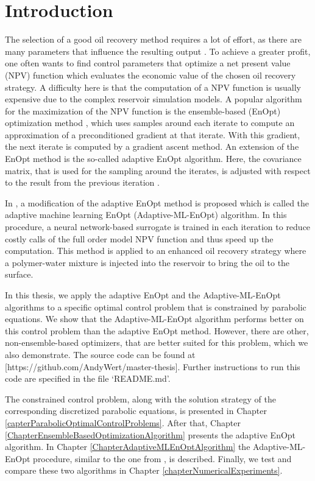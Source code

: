 \chapter{Introduction}

The selection of a good oil recovery method requires a lot of effort, as there are many parameters that influence the resulting output \cite{doi:10.1137/1.9780898717075}. To achieve a greater profit, one often wants to find control parameters that optimize a net present value (NPV) function which evaluates the economic value of the chosen oil recovery strategy. A difficulty here is that the computation of a NPV function is usually expensive due to the complex reservoir simulation models. A popular algorithm for the maximization of the NPV function is the ensemble-based (EnOpt) optimization method \cite{articleChen}, which uses samples around each iterate to compute an approximation of a preconditioned gradient at that iterate. With this gradient, the next iterate is computed by a gradient ascent method. An extension of the EnOpt method is the so-called adaptive EnOpt algorithm. Here, the covariance matrix, that is used for the sampling around the iterates, is adjusted with respect to the result from the previous iteration \cite{Stordal2016-cj}.

In \cite{Keil2022-dj}, a modification of the adaptive EnOpt method is proposed which is called the adaptive machine learning EnOpt (Adaptive-ML-EnOpt) algorithm. In this procedure, a neural network-based surrogate is trained in each iteration to reduce costly calls of the full order model NPV function and thus speed up the computation. This method is applied to an enhanced oil recovery strategy \cite{ABIDIN201211} where a polymer-water mixture is injected into the reservoir to bring the oil to the surface.

In this thesis, we apply the adaptive EnOpt and the Adaptive-ML-EnOpt algorithms to a specific optimal control problem that is constrained by parabolic equations. We show that the Adaptive-ML-EnOpt algorithm performs better on this control problem than the adaptive EnOpt method. However, there are other, non-ensemble-based optimizers, that are better suited for this problem, which we also demonstrate. The source code can be found at [https://github.com/AndyWert/master-thesis]. Further instructions to run this code are specified in the file `README.md'.

The constrained control problem, along with the solution strategy of the corresponding discretized parabolic equations, is presented in Chapter \ref{capterParabolicOptimalControlProblems}. After that, Chapter \ref{ChapterEnsembleBasedOptimizationAlgorithm} presents the adaptive EnOpt algorithm. In Chapter \ref{ChapterAdaptiveMLEnOptAlgorithm} the Adaptive-ML-EnOpt procedure, similar to the one from \cite{Keil2022-dj}, is described. Finally, we test and compare these two algorithms in Chapter \ref{chapterNumericalExperiments}.